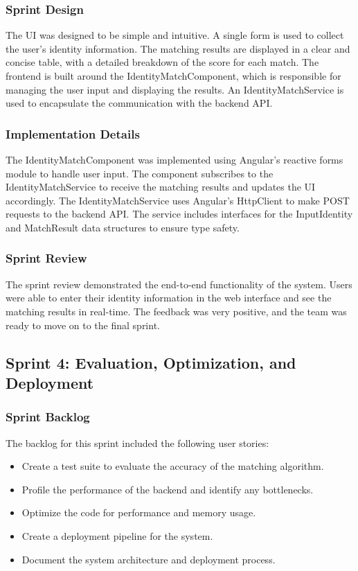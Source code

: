 \subsubsection{Sprint Design}
The UI was designed to be simple and intuitive. A single form is used to collect the user's identity information. The matching results are displayed in a clear and concise table, with a detailed breakdown of the score for each match. The frontend is built around the IdentityMatchComponent, which is responsible for managing the user input and displaying the results. An IdentityMatchService is used to encapsulate the communication with the backend API.

\subsubsection{Implementation Details}
The IdentityMatchComponent was implemented using Angular's reactive forms module to handle user input. The component subscribes to the IdentityMatchService to receive the matching results and updates the UI accordingly. The IdentityMatchService uses Angular's HttpClient to make POST requests to the backend API. The service includes interfaces for the InputIdentity and MatchResult data structures to ensure type safety.

\subsubsection{Sprint Review}
The sprint review demonstrated the end-to-end functionality of the system. Users were able to enter their identity information in the web interface and see the matching results in real-time. The feedback was very positive, and the team was ready to move on to the final sprint.

\subsection{Sprint 4: Evaluation, Optimization, and Deployment}
\subsubsection{Sprint Backlog}
The backlog for this sprint included the following user stories:
\begin{itemize}
    \item Create a test suite to evaluate the accuracy of the matching algorithm.
    \item Profile the performance of the backend and identify any bottlenecks.
    \item Optimize the code for performance and memory usage.
    \item Create a deployment pipeline for the system.
    \item Document the system architecture and deployment process.
\end{itemize}

